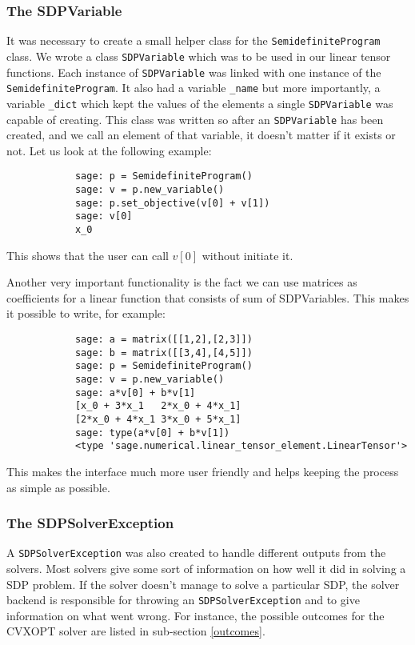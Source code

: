     \subsubsection{The SDPVariable}
    It was necessary to create a small helper class for the \texttt{SemidefiniteProgram} class. We wrote a class \texttt{SDPVariable} which was to be used in our linear tensor functions. Each instance of \texttt{SDPVariable} was linked with one instance of the \texttt{SemidefiniteProgram}. It also had a variable \texttt{\_name} but more importantly, a variable \texttt{\_dict} which kept the values of the elements a single \texttt{SDPVariable} was capable of creating. This class was written so after an \texttt{SDPVariable} has been created, and we call an element of that variable, it doesn't matter if it exists or not. Let us look at the following example:
    
    \begin{verbatim}
            sage: p = SemidefiniteProgram()
            sage: v = p.new_variable()
            sage: p.set_objective(v[0] + v[1])
            sage: v[0]         
            x_0  
    \end{verbatim}
    
This shows that the user can call $v[0]$ without initiate it. 

Another very important functionality is the fact we can use matrices as coefficients for a linear function that consists of sum of SDPVariables. This makes it possible to write, for example:

    \begin{verbatim}
            sage: a = matrix([[1,2],[2,3]])
            sage: b = matrix([[3,4],[4,5]])
            sage: p = SemidefiniteProgram()
            sage: v = p.new_variable()
            sage: a*v[0] + b*v[1]
            [x_0 + 3*x_1   2*x_0 + 4*x_1]
            [2*x_0 + 4*x_1 3*x_0 + 5*x_1]
            sage: type(a*v[0] + b*v[1])
            <type 'sage.numerical.linear_tensor_element.LinearTensor'>
    \end{verbatim}

This makes the interface much more user friendly and helps keeping the process as simple as possible.
    
        \subsubsection{The SDPSolverException}
        A \texttt{SDPSolverException} was also created to handle different outputs from the solvers. Most solvers give some sort of information on how well it did in solving a SDP problem. If the solver doesn't manage to solve a particular SDP, the solver backend is responsible for throwing an \texttt{SDPSolverException} and to give information on what went wrong. For instance, the possible outcomes for the CVXOPT solver are listed in sub-section \ref{outcomes}. 


